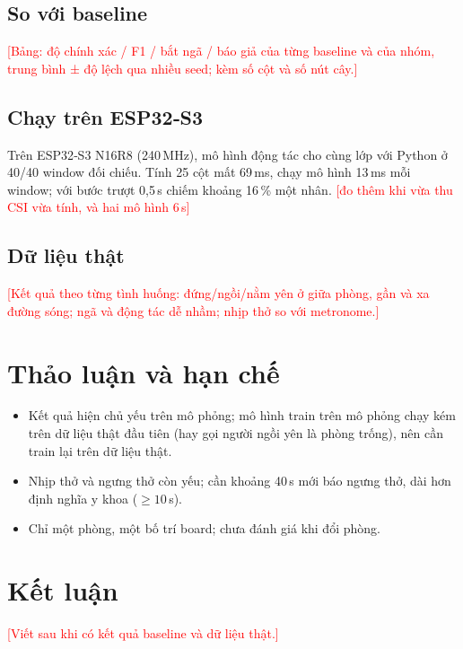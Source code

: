 \documentclass[conference]{IEEEtran}
\newcommand{\canlam}[1]{\textcolor{red}{[#1]}}
\begin{document}
\subsection{So với baseline}
\canlam{Bảng: độ chính xác / F1 / bắt ngã / báo giả của từng baseline và của nhóm, trung bình ± độ lệch qua nhiều seed;
kèm số cột và số nút cây.}

\subsection{Chạy trên ESP32‑S3}
Trên ESP32‑S3 N16R8 (240\,MHz), mô hình động tác cho cùng lớp với Python ở 40/40 window đối chiếu. Tính 25 cột mất
69\,ms, chạy mô hình 13\,ms mỗi window; với bước trượt 0,5\,s chiếm khoảng 16\,\% một nhân. \canlam{đo thêm khi vừa thu
CSI vừa tính, và hai mô hình 6\,s}

\subsection{Dữ liệu thật}
\canlam{Kết quả theo từng tình huống: đứng/ngồi/nằm yên ở giữa phòng, gần và xa đường sóng; ngã và động tác dễ nhầm;
nhịp thở so với metronome.}

\section{Thảo luận và hạn chế}
\begin{itemize}
  \item Kết quả hiện chủ yếu trên mô phỏng; mô hình train trên mô phỏng chạy kém trên dữ liệu thật đầu tiên (hay gọi
    người ngồi yên là phòng trống), nên cần train lại trên dữ liệu thật.
  \item Nhịp thở và ngưng thở còn yếu; cần khoảng 40\,s mới báo ngưng thở, dài hơn định nghĩa y khoa ($\ge 10$\,s).
  \item Chỉ một phòng, một bố trí board; chưa đánh giá khi đổi phòng.
\end{itemize}

\section{Kết luận}
\canlam{Viết sau khi có kết quả baseline và dữ liệu thật.}
\end{document}
